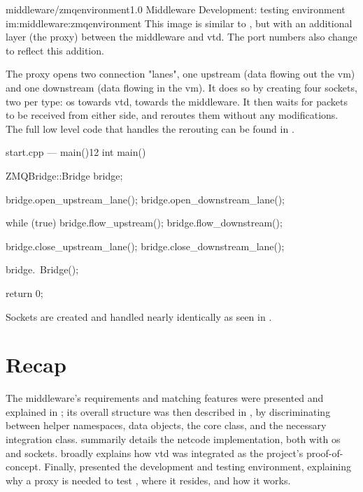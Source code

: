 \begin{image}
	{middleware/zmqenvironment}{1.0}
	{Middleware Development:  testing environment}
	{im:middleware:zmqenvironment}
	{}
	{This image is similar to , but with an additional layer (the \gls{proxy}) between the \gls{middleware} and \gls{vtd}. The port numbers also change to reflect this addition.}
\end{image}

The \gls{proxy} opens two connection "lanes", one upstream (data flowing out the \gls{vm}) and one downstream (data flowing in the \gls{vm}). It does so by creating four sockets, two per type: \gls{os} towards \gls{vtd},  towards the \gls{middleware}. It then waits for \glspl{packet} to be received from either side, and reroutes them without any modifications. The full low level code that handles the rerouting can be found in .

\begin{codelist}{start.cpp --- main()}{12}
int main() {
	ZMQBridge::Bridge bridge;

	bridge.open_upstream_lane();
	bridge.open_downstream_lane();

	while (true) {
		bridge.flow_upstream();
		bridge.flow_downstream();
	}

	bridge.close_upstream_lane();
	bridge.close_downstream_lane();

	bridge.~Bridge();

	return 0;
}
\end{codelist}

Sockets are created and handled nearly identically as seen in .

\section{Recap}\label{sc:middleware:recap}

The \gls{middleware}'s requirements and matching features were presented and explained in ; its overall structure was then described in , by discriminating between helper namespaces, data objects, the core class, and the necessary integration class.  summarily details the \gls{netcode} implementation, both with \gls{os} and  sockets.  broadly explains how \gls{vtd} was integrated as the project's proof-of-concept. Finally,  presented the development and testing environment, explaining why a \gls{proxy} is needed to test , where it resides, and how it works.
